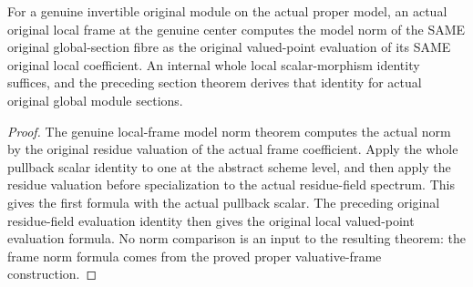 \begin{theorem}
\label{thm:fc-original-local-section-model-norm}
\leanok
{}
For a genuine invertible original module on the actual proper model, an
actual original local frame at the genuine center computes the model norm
of the SAME original global-section fibre as the original valued-point
evaluation of its SAME original local coefficient.  An internal whole
local scalar-morphism identity suffices, and the preceding section theorem
derives that identity for actual original global module sections.
\end{theorem}
\begin{proof}
The genuine local-frame model norm theorem computes the actual norm by the
original residue valuation of the actual frame coefficient.  Apply the
whole pullback scalar identity to one at the abstract scheme level, and
then apply the residue valuation before specialization to the actual
residue-field spectrum.  This gives the first formula with the actual
pullback scalar.  The preceding original residue-field evaluation identity
then gives the original local valued-point evaluation formula.  No norm
comparison is an input to the resulting theorem: the frame norm formula
comes from the proved proper valuative-frame construction.
\end{proof}
